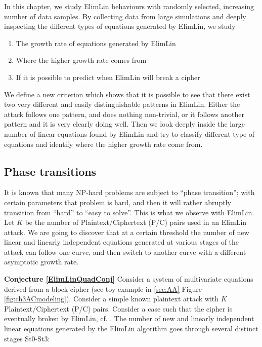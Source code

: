  In this chapter, we study ElimLin behaviours with randomly selected, increasing number of data samples. By collecting data from large simulations and deeply inspecting the different types of equations generated by ElimLin, we study
 
 \begin{enumerate}
 	\item The growth rate of equations generated by ElimLin
 	\item Where the higher growth rate comes from
 	\item If it is possible to predict when ElimLin will break a cipher
 \end{enumerate}
 
We define a new criterion which shows that it is possible to see that there exist two very different and easily distinguishable patterns in ElimLin. Either the attack follows one pattern, and does nothing non-trivial, or it follows another pattern and it is very clearly doing well. Then we look deeply inside the large number of linear equations found by ElimLin and try to classify different type of equations and identify where the higher growth rate come from.

\subsection{Phase transitions}

It is known that many NP-hard problems are subject to ``phase transition''; with certain parameters that problem is hard, and then it will rather abruptly transition from ``hard'' to ``easy to solve''. This is what we observe with ElimLin. %
Let $K$ be the number of Plaintext/Ciphertext (P/C) pairs used in an ElimLin attack. We are going to discover that at a certain threshold the number of new linear and linearly independent equations
generated at various stages of the attack can follow one curve,
and then switch to another curve with a different asymptotic growth rate.



{\bf Conjecture \ref{ElimLinQuadConj}}
\label{ElimLinQuadConj}
Consider a system of multivariate equations derived from a block cipher (see toy example in \ref{sec:AA} Figure \ref{fig:ch3ACmodeling}). %
Consider a simple known plaintext attack with $K$ Plaintext/Ciphertext (P/C) pairs.
Consider a case such that the cipher is eventually broken by ElimLin, cf. \cite{FastAlg,FastAlg2,ToyRijSer,AlgteachElimLinLab,RaddumSimon}.
The number of new and linearly independent linear equations generated
by the ElimLin algorithm goes through several distinct stages St0-St3:

